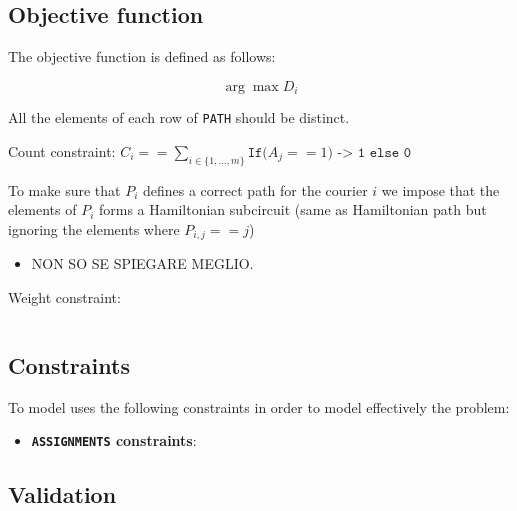 \subsection{Objective function}
The objective function is defined as follows:

\[ \arg \max D_i  \]
    \item All the elements of each row of \texttt{PATH} should be distinct.

    \item Count constraint: $C_i == \sum_{i \in \{1, \dots, m\}} \texttt{If(} A_j == 1 \texttt{) -> 1 else 0}$

    \item To make sure that $P_i$ defines a correct path for the courier $i$ we impose that the elements of $P_i$ forms a Hamiltonian subcircuit (same as Hamiltonian path but ignoring the elements where $P_{i,j} == j$)

    \begin{itemize}
        \item NON SO SE SPIEGARE MEGLIO.
    \end{itemize}

    \item Weight constraint: 
        
\[\]


\subsection{Constraints}
To model uses the following constraints in order to model effectively the problem:

\begin{itemize}
    \item \textbf{\texttt{ASSIGNMENTS} constraints}: 
\end{itemize}


\subsection{Validation}